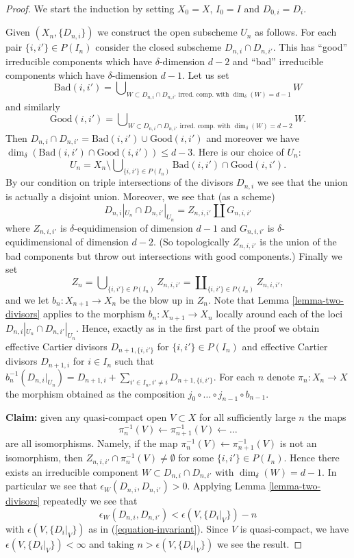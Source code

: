 \begin{proof}
\medskip\noindent
We start the induction by setting $X_0 = X$,
$I_0 = I$ and $D_{0, i} = D_i$.

\medskip\noindent
Given $(X_n, \{D_{n, i}\})$ we construct the open subscheme
$U_n$ as follows. For each pair $\{i, i'\} \in P(I_n)$ consider
the closed subscheme $D_{n, i} \cap D_{n, i'}$. This has ``good''
irreducible components which have $\delta$-dimension $d - 2$ and
``bad'' irreducible components which have $\delta$-dimension $d - 1$.
Let us set
$$
\text{Bad}(i, i')
=
\bigcup\nolimits_{W \subset D_{n, i} \cap D_{n, i'}
\text{ irred.\ comp. with }\dim_\delta(W) = d - 1} W
$$
and similarly
$$
\text{Good}(i, i')
=
\bigcup\nolimits_{W \subset D_{n, i} \cap D_{n, i'}
\text{ irred.\ comp. with }\dim_\delta(W) = d - 2} W.
$$
Then $D_{n, i} \cap D_{n, i'} = \text{Bad}(i, i') \cup \text{Good}(i, i')$
and moreover we have
$\dim_\delta(\text{Bad}(i, i') \cap \text{Good}(i, i')) \leq d - 3$.
Here is our choice of $U_n$:
$$
U_n
=
X_n
\setminus
\bigcup\nolimits_{\{i, i'\} \in P(I_n)}
\text{Bad}(i, i') \cap \text{Good}(i, i').
$$
By our condition on triple intersections of the divisors $D_{n, i}$
we see that the union is actually a disjoint union. Moreover,
we see that (as a scheme)
$$
D_{n, i}|_{U_n} \cap D_{n, i'}|_{U_n}
=
Z_{n, i, i'} \coprod G_{n, i, i'}
$$
where $Z_{n, i, i'}$ is $\delta$-equidimension of dimension $d - 1$
and $G_{n, i, i'}$ is $\delta$-equidimensional of dimension $d - 2$.
(So topologically $Z_{n, i, i'}$ is the union of the bad components
but throw out intersections with good components.) Finally we set
$$
Z_n =
\bigcup\nolimits_{\{i, i'\} \in P(I_n)} Z_{n, i, i'} =
\coprod\nolimits_{\{i, i'\} \in P(I_n)} Z_{n, i, i'},
$$
and we let $b_n : X_{n + 1} \to X_n$ be the blow up in $Z_n$.
Note that Lemma \ref{lemma-two-divisors}
applies to the morphism $b_n : X_{n + 1} \to X_n$ locally around
each of the loci $D_{n, i}|_{U_n} \cap D_{n, i'}|_{U_n}$. Hence,
exactly as in the first part of the proof we obtain effective
Cartier divisors $D_{n + 1, \{i, i'\}}$ for $\{i, i'\} \in P(I_n)$
and effective Cartier divisors $D_{n + 1, i}$ for $i \in I_n$
such that
$b_n^{-1}(D_{n, i}|_{U_n}) = D_{n + 1, i} +
\sum\nolimits_{i' \in I_n, i' \not = i} D_{n + 1, \{i, i'\}}$.
For each $n$ denote $\pi_n : X_n \to X$ the morphism obtained
as the composition $j_0 \circ \ldots \circ j_{n - 1} \circ b_{n - 1}$.

\medskip\noindent
{\bf Claim:} given any quasi-compact open $V \subset X$
for all sufficiently large $n$ the maps
$$
\pi_n^{-1}(V) \leftarrow \pi_{n + 1}^{-1}(V) \leftarrow \ldots
$$
are all isomorphisms. Namely, if the map
$\pi_n^{-1}(V) \leftarrow \pi_{n + 1}^{-1}(V)$ is not an isomorphism,
then $Z_{n, i, i'} \cap \pi_n^{-1}(V) \not = \emptyset$ for some
$\{i, i'\} \in P(I_n)$. Hence there exists an irreducible component
$W \subset D_{n, i} \cap D_{n, i'}$ with $\dim_\delta(W) = d - 1$.
In particular we see that $\epsilon_W(D_{n, i}, D_{n, i'}) > 0$.
Applying Lemma \ref{lemma-two-divisors} repeatedly we see that
$$
\epsilon_W(D_{n, i}, D_{n, i'})
<
\epsilon(V, \{D_i|_V\}) - n
$$
with $\epsilon(V, \{D_i|_V\})$ as in (\ref{equation-invariant}).
Since $V$ is quasi-compact, we have
$\epsilon(V, \{D_i|_V\}) < \infty$ and taking $n > \epsilon(V, \{D_i|_V\})$
we see the result.


\end{proof}

